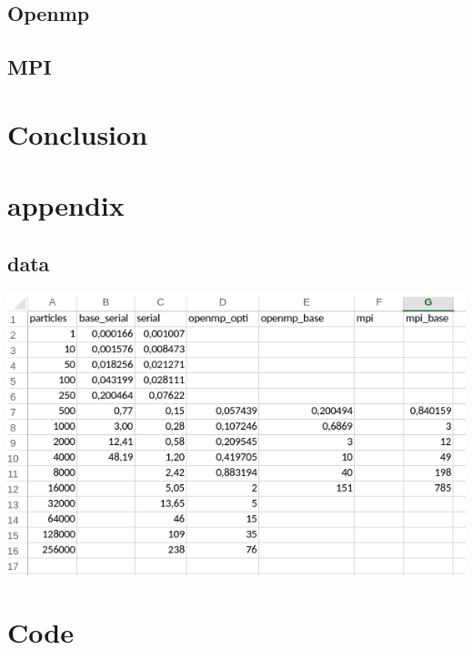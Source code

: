 \documentclass[a4paper,10pt,titlepage]{report}
\begin{document}
\subsection{Openmp}

\subsection{MPI}

\section{Conclusion}
\newpage
\section{appendix}
\subsection{data}
\includegraphics[scale=0.7]{alldata}

\section{Code}

%

%
\end{document}

